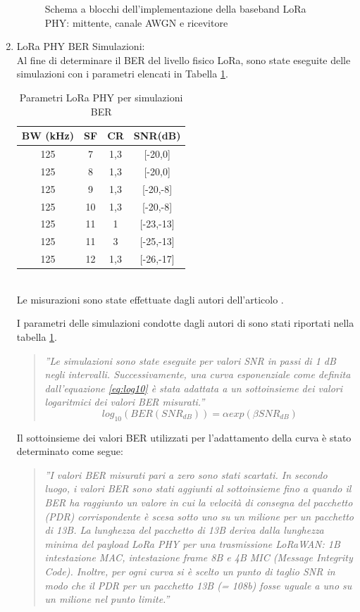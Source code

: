 \documentclass[a4paper]{report} %
\begin{document}
\begin{enumerate}
\begin{figure}
\caption{Schema a blocchi dell'implementazione della baseband LoRa PHY: mittente, canale AWGN e ricevitore}
\label{fig:schemaloraphy}
\end{figure}
\item LoRa PHY BER Simulazioni:  \\
Al fine di determinare il BER del livello fisico LoRa, sono state eseguite delle simulazioni con i parametri elencati in Tabella \ref{tab:loraphy}. 


\begin{table}
\caption{Parametri LoRa PHY per simulazioni BER} 
\label{tab:loraphy}
\begin{center}
\begin{tabular}{|c|c|c|c|}
BW (kHz)&SF&CR&SNR(dB)\\ \hline
125&7&1,3&[-20,0]\\ \hline
125&8&1,3&[-20,0]\\ \hline
125&9&1,3&[-20,-8]\\ \hline
125&10&1,3&[-20,-8]\\ \hline
125&11&1&[-23,-13]\\ \hline
125&11&3&[-25,-13]\\ \hline
125&12&1,3&[-26,-17]\\ \hline
\end{tabular} 
\\
Le misurazioni sono state effettuate dagli autori dell'articolo \cite{art:rif.49}. \\
\end{center}
\end{table}


I parametri delle simulazioni condotte dagli autori di \cite{art:rif.49} sono stati riportati nella tabella \ref{tab:loraphy}.
\begin{quote}
	\textit{''Le simulazioni sono state eseguite per valori SNR in passi di 1 dB negli intervalli. Successivamente, una curva esponenziale come definita dall'equazione \ref{eq:log10} è stata adattata a un sottoinsieme dei valori logaritmici dei valori BER misurati.''}
	\begin{equation}
	\label{eq:log10}
	log_{10}(BER (SNR_{dB})) = \alpha exp (\beta SNR_{dB})
	\end{equation}
\end{quote}
Il sottoinsieme dei valori BER utilizzati per l'adattamento della curva è stato determinato come segue:
\begin{quote}
	\textit{''I valori BER misurati pari a zero sono stati scartati. In secondo luogo, i valori BER sono stati aggiunti al sottoinsieme fino a quando il BER ha raggiunto un valore in cui la velocità di consegna del pacchetto (PDR) corrispondente è scesa sotto uno su un milione per un pacchetto di 13B. La lunghezza del pacchetto di 13B deriva dalla lunghezza minima del payload LoRa PHY per una trasmissione LoRaWAN: 1B intestazione MAC, intestazione frame 8B e 4B MIC (Message Integrity Code). Inoltre, per ogni curva si è scelto un punto di taglio SNR in modo che il PDR per un pacchetto 13B (= 108b) fosse uguale a uno su un milione nel punto limite.''}
\end{quote}
\end{enumerate}
\end{document}
